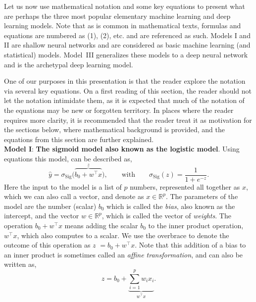 Let us now use mathematical notation and some key equations to present what are perhaps the three most popular elementary machine learning and deep learning models. Note that as is common in mathematical texts, formulas and equations are numbered as (1), (2), etc. and are referenced as such. Models I and II are shallow neural networks and are considered as basic machine learning (and statistical) models. Model~III generalizes these models to a deep neural network and is the archetypal deep learning model.

One of our purposes in this presentation is that the reader explore the notation via several key equations. On a first reading of this section, the reader should not let the notation intimidate them, as it is expected that much of the notation of the equations may be new or forgotten territory. In places where the reader requires more clarity, it is recommended that the reader treat it as motivation for the sections below, where mathematical background is provided, and the equations from this section are further explained. \\

\noindent
{\bf Model I}: {\bf The sigmoid model also known as the logistic model}. Using equations this model, can be described as,
%
\begin{equation}
\label{eq:first-shallow-view}
\hat{y}=\sigma_{\text{Sig}}\big(\overbrace{b_0+w^\top  x}^{z}\big),
\qquad
\text{with}
\qquad
\sigma_{\text{Sig}}(z) = \frac{1}{1+e^{-z}}.
\end{equation}
%
Here the input to the model is a list of $p$ numbers, represented all together as $x$, which we can also call a vector, and denote as $x\in {\mathbb R}^p$. The parameters of the model are the number (scalar) $b_0$ which is called the {\em bias}, also known as the intercept, and the vector $w\in {\mathbb R}^p$, which is called the vector of {\em weights}. The operation $b_0 + w^\top x$ means adding the scalar $b_0$ to the inner product operation, $w^\top x$, which also computes to a scalar. We use the overbrace to denote the outcome of this operation as $z$ $=b_0+w^\top x$. Note that this addition of a bias to an inner product is sometimes called an {\em affine transformation}, and can also be written as,
%
\begin{equation}
\label{eq:smallz-only-log-mult}
z = b_0 + \underbrace{\sum_{i=1}^p w_i x_i}_{w^\top x}.
\end{equation}

